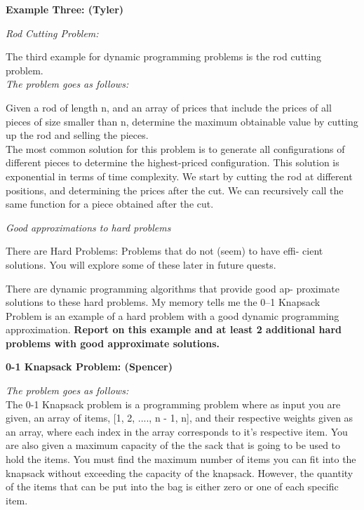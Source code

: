 \documentclass{article}
\begin{document}
\bigskip

\noindent \textbf{Example Three: (Tyler)}


\noindent \textit{Rod Cutting Problem:}

The third example for dynamic programming problems is the rod cutting problem.\\

\noindent \textit{The problem goes as follows:}

Given a rod of length n, and an array of prices that include the prices of all 
pieces of size smaller than n, determine the maximum obtainable value by
cutting up the rod and selling the pieces.\\

The most common solution for this problem is to generate all configurations
of different pieces to determine the highest-priced configuration. This solution is
exponential in terms of time complexity. We start by cutting the rod at different
positions, and determining the prices after the cut. We can recursively call the
same function for a piece obtained after the cut.

\bigskip

\pagebreak

\noindent \textit{Good approximations to hard problems}

\medskip

There are Hard Problems: Problems that do not (seem) to have effi-
cient solutions. You will explore some of these later in future quests.

\medskip

There are dynamic programming algorithms that provide good ap-
proximate solutions to these hard problems. My memory tells me the
0–1 Knapsack Problem is an example of a hard problem with a good
dynamic programming approximation. \textbf{Report on this example and
at least 2 additional hard problems with good approximate solutions.}

\bigskip

\noindent \textbf{0-1 Knapsack Problem: (Spencer)} 

\noindent \textit{The problem goes as follows:} \\

The 0-1 Knapsack problem is a programming problem where as input you
are given, an array of items, [1, 2, ...., n - 1, n], and their 
respective weights given as an array, where each index in the array
corresponds to it's respective item. You are also given a maximum capacity
of the the sack that is going to be used to hold the items. You must find
the maximum number of items you can fit into the knapsack without exceeding
the capacity of the knapsack. However, the quantity of the items that can
be put into the bag is either zero or one of each specific item.
\end{document}
